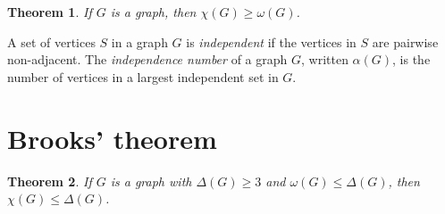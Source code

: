 \documentclass[openany]{tufte-book} %
\theoremstyle{plain}
\newtheorem{theorem}{Theorem}
\begin{document}
\begin{theorem}\label{OmegaLowerBound}
If $G$ is a graph, then $\chi(G) \ge \omega(G)$.
\end{theorem}

A set of vertices $S$ in a graph $G$ is \emph{independent} if the vertices in $S$ are pairwise non-adjacent.
The \emph{independence number} of a graph $G$, written $\alpha(G)$, is the number of vertices in a largest independent set in $G$.

\section{Brooks' theorem}
\begin{theorem}
If $G$ is a graph with $\Delta(G) \ge 3$ and $\omega(G) \le \Delta(G)$, then $\chi(G) \le \Delta(G)$.
\label{BrooksTheorem}
\end{theorem}
\end{document}
